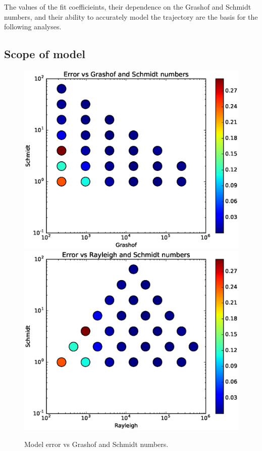 The values of the fit coefficieints, their dependence on the Grashof and Schmidt numbers, and their ability to accurately model the trajectory are the basis for the following analyses.

\subsection{Scope of model}

\begin{figure}
\includegraphics[width=\columnwidth]{figs/Error-vs-Grashof-Schmidt}
\includegraphics[width=\columnwidth]{figs/Error-vs-Rayleigh-Schmidt}
\caption{ 
  Model error vs Grashof and Schmidt numbers.
}
\end{figure}

